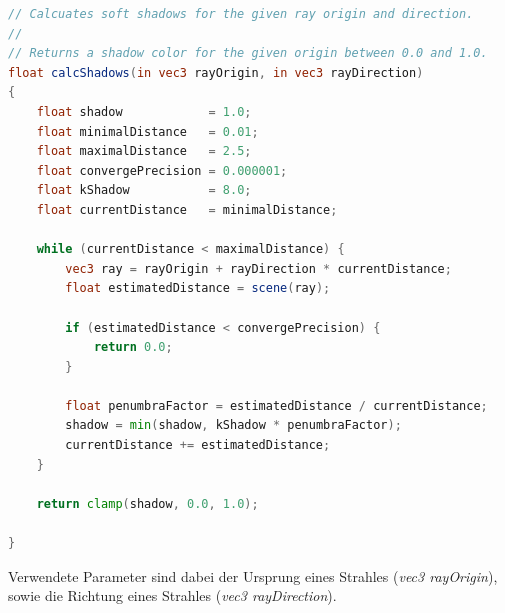 \begin{lstlisting}[language=GLSL,caption={Funktion zur Berechnung von
        weichen Schatten  in
        GLSL.},label={alg:glsl_soft_shadows},captionpos=b,emph={calcShadows}]
// Calcuates soft shadows for the given ray origin and direction.
//
// Returns a shadow color for the given origin between 0.0 and 1.0.
float calcShadows(in vec3 rayOrigin, in vec3 rayDirection)
{
    float shadow            = 1.0;
    float minimalDistance   = 0.01;
    float maximalDistance   = 2.5;
    float convergePrecision = 0.000001;
    float kShadow           = 8.0;
    float currentDistance   = minimalDistance;

    while (currentDistance < maximalDistance) {
        vec3 ray = rayOrigin + rayDirection * currentDistance;
        float estimatedDistance = scene(ray);

        if (estimatedDistance < convergePrecision) {
            return 0.0;
        }

        float penumbraFactor = estimatedDistance / currentDistance;
        shadow = min(shadow, kShadow * penumbraFactor);
        currentDistance += estimatedDistance;
    }

    return clamp(shadow, 0.0, 1.0);

}
\end{lstlisting}

Verwendete Parameter sind dabei der Ursprung eines Strahles
(\textit{vec3 rayOrigin}), sowie die Richtung eines Strahles
(\textit{vec3 rayDirection}). 

